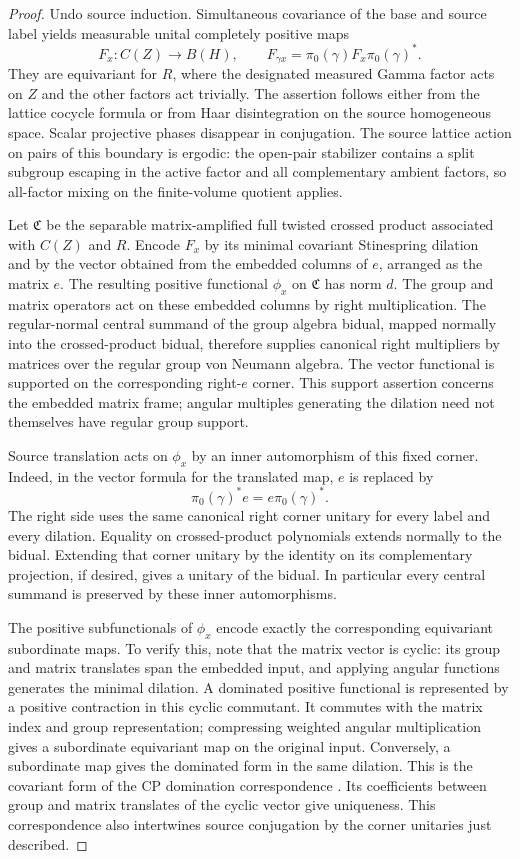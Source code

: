 \begin{proof}
Undo source induction. Simultaneous covariance of the base and source
label yields measurable unital completely positive maps
\[
 F_x:C(Z)\longrightarrow B(H),\qquad
 F_{\gamma x}=\pi_0(\gamma)F_x\pi_0(\gamma)^*.
\]
They are equivariant for $R$, where the designated measured Gamma
factor acts on $Z$ and the other factors act trivially. The assertion
follows either from the lattice cocycle formula or from Haar
disintegration on the source homogeneous space. Scalar projective
phases disappear in conjugation. The source lattice action on pairs
of this boundary is ergodic: the open-pair stabilizer contains a split
subgroup escaping in the active factor and all complementary ambient
factors, so all-factor mixing on the finite-volume quotient applies.

Let $\mathfrak C$ be the separable matrix-amplified full twisted
crossed product associated with $C(Z)$ and $R$. Encode $F_x$ by its
minimal covariant Stinespring dilation~\cite{Stinespring1955} and by the vector obtained from the
embedded columns of $e$, arranged as the matrix $e$. The resulting
positive functional $\phi_x$ on $\mathfrak C$ has norm $d$.
The group and matrix operators act on these embedded columns by right
multiplication. The regular-normal central summand of the group
algebra bidual, mapped normally into the crossed-product bidual,
therefore supplies canonical right multipliers by matrices over the
regular group von Neumann algebra. The vector functional is supported
on the corresponding right-$e$ corner. This support assertion concerns
the embedded matrix frame; angular multiples generating the dilation
need not themselves have regular group support.

Source translation acts on $\phi_x$ by an inner automorphism of this
fixed corner. Indeed, in the vector formula for the translated map,
$e$ is replaced by
\[
 \pi_0(\gamma)^*e=e\pi_0(\gamma)^*.
\]
The right side uses the same canonical right corner unitary for every
label and every dilation. Equality on crossed-product polynomials
extends normally to the bidual. Extending that corner unitary by the
identity on its complementary projection, if desired, gives a unitary
of the bidual. In particular every central summand is preserved by
these inner automorphisms.

The positive subfunctionals of $\phi_x$ encode exactly the
corresponding equivariant subordinate maps. To verify this, note that
the matrix vector is cyclic: its group and matrix translates span the
embedded input, and applying angular functions generates the minimal
dilation. A dominated positive functional is represented by a
positive contraction in this cyclic commutant. It commutes with the
matrix index and group representation; compressing weighted angular
multiplication gives a subordinate equivariant map on the original
input. Conversely, a subordinate map gives the dominated form in the
same dilation. This is the covariant form of the CP domination
correspondence \cite[Theorem~1.4.2]{Arveson1969}. Its coefficients between group and matrix translates
of the cyclic vector give uniqueness. This correspondence also
intertwines source conjugation by the corner unitaries just described.


\end{proof}
